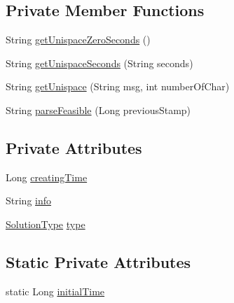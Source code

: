 \subsection*{Private Member Functions}
\begin{DoxyCompactItemize}
\item 
String \hyperlink{classit_1_1emarolab_1_1cagg_1_1core_1_1evaluation_1_1interfacing_1_1GuiEvaluationInterface_1_1EvaluatingInfoPrimitive_a640c1590a18b9ff525766bfa2f754576}{get\-Unispace\-Zero\-Seconds} ()
\item 
String \hyperlink{classit_1_1emarolab_1_1cagg_1_1core_1_1evaluation_1_1interfacing_1_1GuiEvaluationInterface_1_1EvaluatingInfoPrimitive_ab85f476191153f882b242a1e88cebb1c}{get\-Unispace\-Seconds} (String seconds)
\item 
String \hyperlink{classit_1_1emarolab_1_1cagg_1_1core_1_1evaluation_1_1interfacing_1_1GuiEvaluationInterface_1_1EvaluatingInfoPrimitive_ae062fc6078a9ba61c40e2a408c6d855f}{get\-Unispace} (String msg, int number\-Of\-Char)
\item 
String \hyperlink{classit_1_1emarolab_1_1cagg_1_1core_1_1evaluation_1_1interfacing_1_1GuiEvaluationInterface_1_1EvaluatingInfoPrimitive_a01a0fbffd52372278010aa66f9521680}{parse\-Feasible} (Long previous\-Stamp)
\end{DoxyCompactItemize}
\subsection*{Private Attributes}
\begin{DoxyCompactItemize}
\item 
Long \hyperlink{classit_1_1emarolab_1_1cagg_1_1core_1_1evaluation_1_1interfacing_1_1GuiEvaluationInterface_1_1EvaluatingInfoPrimitive_ac3fe44ddfa4450a6c8f6f2055b07d499}{creating\-Time}
\item 
String \hyperlink{classit_1_1emarolab_1_1cagg_1_1core_1_1evaluation_1_1interfacing_1_1GuiEvaluationInterface_1_1EvaluatingInfoPrimitive_aaf07c02e027c25b54e1a82cb89285834}{info}
\item 
\hyperlink{enumit_1_1emarolab_1_1cagg_1_1core_1_1evaluation_1_1interfacing_1_1GuiEvaluationInterface_1_1SolutionType}{Solution\-Type} \hyperlink{classit_1_1emarolab_1_1cagg_1_1core_1_1evaluation_1_1interfacing_1_1GuiEvaluationInterface_1_1EvaluatingInfoPrimitive_ade941c8c8ef34bec3348bc17d9073335}{type}
\end{DoxyCompactItemize}
\subsection*{Static Private Attributes}
\begin{DoxyCompactItemize}
\item 
static Long \hyperlink{classit_1_1emarolab_1_1cagg_1_1core_1_1evaluation_1_1interfacing_1_1GuiEvaluationInterface_1_1EvaluatingInfoPrimitive_ad89465c7a67680c61b0e8818624ba29e}{initial\-Time}
\end{DoxyCompactItemize}


